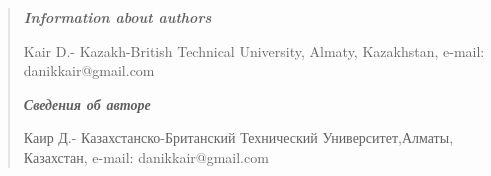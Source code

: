 \begin{quote}
\emph{{\bfseries Information about authors}}

Kair D.- Kazakh-British Technical University, Almaty, Kazakhstan,
e-mail: danikkair@gmail.com

\emph{{\bfseries Сведения об авторе}}

\emph{{\bfseries \hfill\break
}}Каир Д.- Казахстанско-Британский Технический Университет,Алматы,
Казахстан, e-mail: danikkair@gmail.com
\end{quote}
